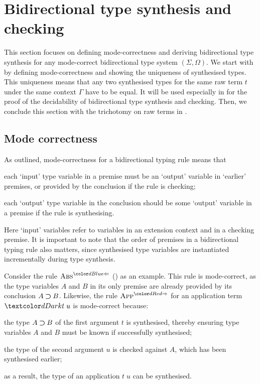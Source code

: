 
\section{Bidirectional type synthesis and checking} \label{sec:type-synthesis}
This section focuses on defining mode-correctness and deriving bidirectional type synthesis for any mode-correct bidirectional type system $(\Sigma, \Omega)$.
We start with  by defining mode-correctness and showing the uniqueness of synthesised types.
This uniqueness means that any two synthesised types for the same raw term $t$ under the same context $\Gamma$ have to be equal.
It will be used especially in  for the proof of the decidability of bidirectional type synthesis and checking.
Then, we conclude this section with the trichotomy on raw terms in .

\subsection{Mode correctness}\label{sec:mode-correctness}
As \citet{Dunfield2021} outlined, mode-correctness for a bidirectional typing rule means that 
\begin{inlineenum}
\item each `input' type variable in a premise must be an `output' variable in `earlier' premises, or provided by the conclusion if the rule is checking;
\item each `output' type variable in the conclusion should be some `output' variable in a premise if the rule is synthesising.
\end{inlineenum}
Here `input' variables refer to variables in an extension context and in a checking premise.
It is important to note that the order of premises in a bidirectional typing rule also matters, since synthesised type variables are instantiated incrementally during type synthesis.

Consider the rule $\ChkRule{Abs}$ () as an example.
This rule is mode-correct, as the type variables $A$ and $B$ in its only premise are already provided by its conclusion $A \mathbin{\bm{\supset}} B$.
Likewise, the rule $\SynRule{App}$ for an application term $\isTerm{t\;u}$ is mode-correct because:
\begin{inlineenum}
\item the type $A \mathbin{\bm{\supset}} B$ of the first argument $t$ is synthesised, thereby ensuring type variables $A$ and $B$ must be known if successfully synthesised;
\item the type of the second argument $u$ is checked against $A$, which has been synthesised earlier;
\item as a result, the type of an application $t\;u$ can be synthesised.
\end{inlineenum}

